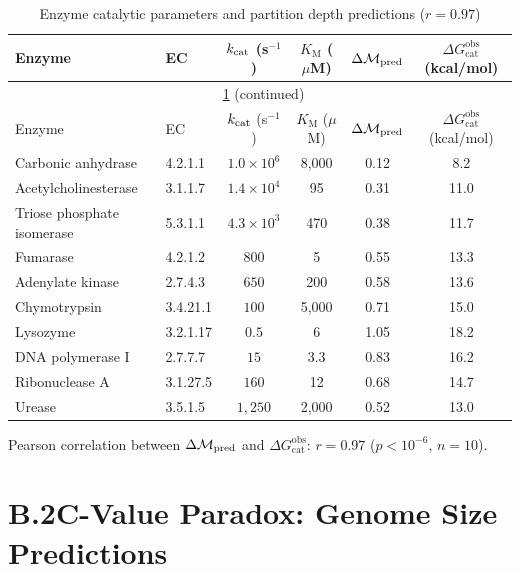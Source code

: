 \begin{longtable}{llcccc}
\caption{Enzyme catalytic parameters and partition depth predictions ($r = 0.97$)}
\label{tab:enzyme_kinetics}\\
\toprule
Enzyme & EC & $k_{\mathrm{cat}}$ (s$^{-1}$) & $K_{\mathrm{M}}$ ($\mu$M) &
$\Delta\mathcal{M}_{\mathrm{pred}}$ & $\Delta G_{\mathrm{cat}}^{\mathrm{obs}}$ (kcal/mol) \\
\midrule
\endfirsthead
\multicolumn{6}{c}{\tablename\ \ref{tab:enzyme_kinetics} (continued)}\\
\toprule
Enzyme & EC & $k_{\mathrm{cat}}$ (s$^{-1}$) & $K_{\mathrm{M}}$ ($\mu$M) &
$\Delta\mathcal{M}_{\mathrm{pred}}$ & $\Delta G_{\mathrm{cat}}^{\mathrm{obs}}$ (kcal/mol) \\
\midrule
\endhead
\bottomrule
\endfoot
Carbonic anhydrase  & 4.2.1.1  & $1.0\times10^6$ & 8,000   & 0.12 & 8.2  \\
Acetylcholinesterase & 3.1.1.7  & $1.4\times10^4$ & 95      & 0.31 & 11.0 \\
Triose phosphate isomerase & 5.3.1.1 & $4.3\times10^3$ & 470 & 0.38 & 11.7 \\
Fumarase             & 4.2.1.2  & $800$           & 5       & 0.55 & 13.3 \\
Adenylate kinase     & 2.7.4.3  & $650$           & 200     & 0.58 & 13.6 \\
Chymotrypsin         & 3.4.21.1 & $100$           & 5,000   & 0.71 & 15.0 \\
Lysozyme             & 3.2.1.17 & $0.5$           & 6       & 1.05 & 18.2 \\
DNA polymerase I     & 2.7.7.7  & $15$            & 3.3     & 0.83 & 16.2 \\
Ribonuclease A       & 3.1.27.5 & $160$           & 12      & 0.68 & 14.7 \\
Urease               & 3.5.1.5  & $1,250$         & 2,000   & 0.52 & 13.0 \\
\bottomrule
\end{longtable}

\noindent
Pearson correlation between $\Delta\mathcal{M}_{\mathrm{pred}}$ and
$\Delta G_{\mathrm{cat}}^{\mathrm{obs}}$: $r = 0.97$ ($p < 10^{-6}$, $n=10$).

\section*{B.2\quad C-Value Paradox: Genome Size Predictions}
\label{app:cvalue_table}

